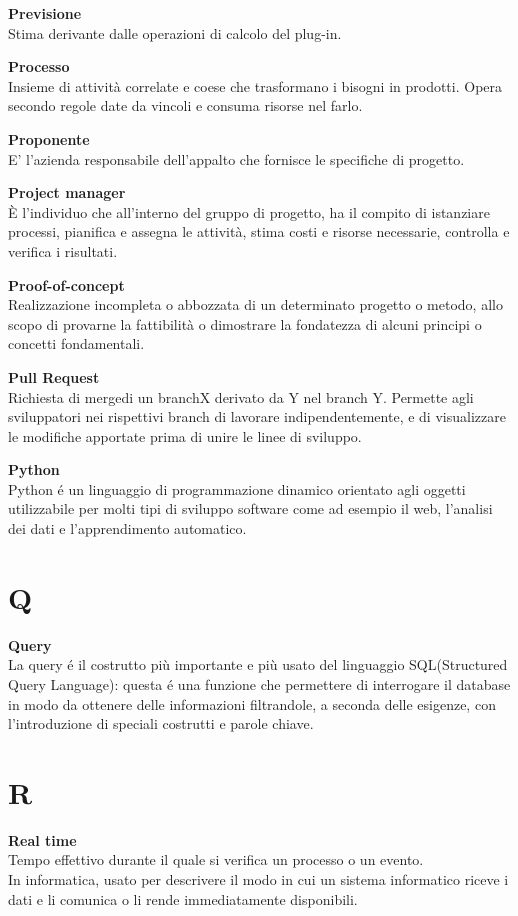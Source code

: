 \documentclass[a4paper, oneside, openany, dvipsnames, table, 12pt]{article}
\begin{document}
\textbf{Previsione} \\
Stima derivante dalle operazioni di calcolo del plug-in.

\textbf{Processo} \\
Insieme di attività correlate e coese che trasformano i bisogni in prodotti. Opera secondo regole date da vincoli e consuma risorse nel farlo.

\textbf{Proponente} \\
E' l'azienda responsabile dell'appalto che fornisce le specifiche di progetto.

\textbf{Project manager} \\
È l'individuo che all'interno del gruppo di progetto, ha il compito di istanziare processi, pianifica e assegna le attività, stima costi e risorse necessarie, controlla e verifica i risultati.

\textbf{Proof-of-concept} \\
Realizzazione incompleta o abbozzata di un determinato progetto o metodo, allo scopo di provarne la fattibilità o dimostrare la fondatezza di alcuni principi o concetti fondamentali.

\textbf{Pull Request} \\
Richiesta di merge\glo di un branch\glo X derivato da Y nel branch Y. Permette agli sviluppatori nei rispettivi branch di lavorare indipendentemente, e di visualizzare le modifiche apportate prima di unire le linee di sviluppo.

\textbf{Python} \\
Python \'e un linguaggio di programmazione dinamico orientato agli oggetti utilizzabile per molti tipi di sviluppo software come ad esempio il web, l'analisi dei dati e l'apprendimento automatico.

\newpage
\section{Q}
\textbf{Query} \\
La query \'e il costrutto più importante e più usato del linguaggio SQL(Structured Query Language): questa \'e una funzione che permettere di interrogare il database in modo da ottenere delle informazioni filtrandole, a seconda delle esigenze, con l'introduzione di speciali costrutti e parole chiave.

\newpage
\section{R}
\textbf{Real time} \\
Tempo effettivo durante il quale si verifica un processo o un evento. \\
In informatica, usato per descrivere il modo in cui un sistema informatico riceve i dati e li comunica o li rende immediatamente disponibili.
\end{document}
